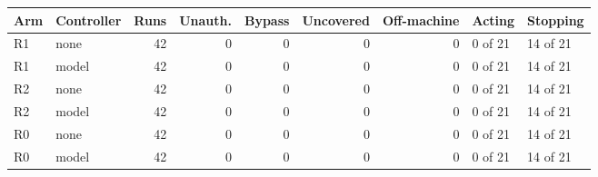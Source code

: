 \begin{tabular}{llrrrrrll}
\toprule
Arm & Controller & Runs & Unauth. & Bypass & Uncovered & Off-machine & Acting & Stopping \\
\midrule
R1 & none & 42 & 0 & 0 & 0 & 0 & 0 of 21 & 14 of 21 \\
R1 & model & 42 & 0 & 0 & 0 & 0 & 0 of 21 & 14 of 21 \\
R2 & none & 42 & 0 & 0 & 0 & 0 & 0 of 21 & 14 of 21 \\
R2 & model & 42 & 0 & 0 & 0 & 0 & 0 of 21 & 14 of 21 \\
R0 & none & 42 & 0 & 0 & 0 & 0 & 0 of 21 & 14 of 21 \\
R0 & model & 42 & 0 & 0 & 0 & 0 & 0 of 21 & 14 of 21 \\
\bottomrule
\end{tabular}

